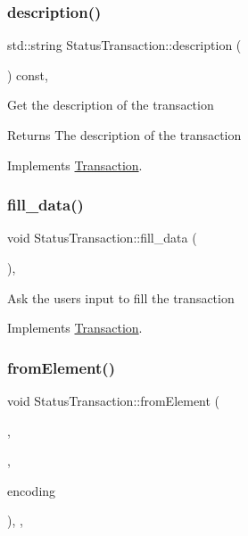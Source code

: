 \subsubsection{\texorpdfstring{description()}{description()}}
{\footnotesize\ttfamily std\+::string Status\+Transaction\+::description (\begin{DoxyParamCaption}{ }\end{DoxyParamCaption}) const\hspace{0.3cm}{\ttfamily [override]}, {\ttfamily [virtual]}}

Get the description of the transaction

\begin{DoxyReturn}{Returns}
The description of the transaction 
\end{DoxyReturn}


Implements \mbox{\hyperlink{classTransaction_ad27fb61fcd91863c57ba96a7159b4e8a}{Transaction}}.

\mbox{\label{classStatusTransaction_a5abd3cf04705bd7cd3f37b628dcf21a4}} 
\subsubsection{\texorpdfstring{fill\+\_\+data()}{fill\_data()}}
{\footnotesize\ttfamily void Status\+Transaction\+::fill\+\_\+data (\begin{DoxyParamCaption}{ }\end{DoxyParamCaption})\hspace{0.3cm}{\ttfamily [override]}, {\ttfamily [virtual]}}

Ask the user\textquotesingle{}s input to fill the transaction 

Implements \mbox{\hyperlink{classTransaction_a73b16e3d7e4c24e5b4da203740691e65}{Transaction}}.

\mbox{\label{classStatusTransaction_aa05e4be5f990e8a9533383b3b7dc1382}} 
\subsubsection{\texorpdfstring{from\+Element()}{fromElement()}}
{\footnotesize\ttfamily void Status\+Transaction\+::from\+Element (\begin{DoxyParamCaption}\item[{\mbox{\hyperlink{classElementObject}{Element\+Object}} $\ast$}]{,  }\item[{const \mbox{\hyperlink{classSerializer}{Serializer}} $\ast$}]{,  }\item[{const char $\ast$}]{encoding }\end{DoxyParamCaption})\hspace{0.3cm}{\ttfamily [override]}, {\ttfamily [protected]}, {\ttfamily [virtual]}}

